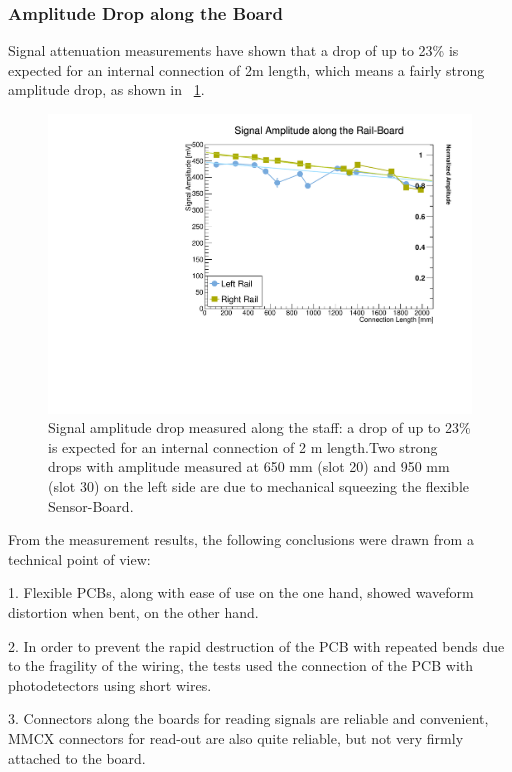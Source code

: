\documentclass[../BTOF_summary.tex]{subfiles}
\begin{document}
\subsubsection{Amplitude Drop along the Board}
Signal attenuation measurements have shown that a drop of up to 23\% is expected for an internal connection of 2m length, which means a fairly strong amplitude drop, as shown in \fig~\ref{fig:SA}.

\begin{figure}[h!]
    \centering
    \includegraphics[scale=0.5]{Pictures/SignalAmplitude.pdf}
    \caption{Signal amplitude drop measured along the staff: a drop of up to 23\% is expected for an internal connection of 2 m length.Two strong drops with amplitude measured at 650 mm (slot 20) and 950 mm (slot 30) on the left side are due to mechanical squeezing the flexible Sensor-Board.}
    \label{fig:SA}
\end{figure}



From the measurement results, the following conclusions were drawn from a technical point of view:

1. Flexible PCBs, along with ease of use on the one hand, showed waveform distortion when bent, on the other hand.

2. In order to prevent the rapid destruction of the PCB with repeated bends due to the fragility of the wiring, the tests used the connection of the PCB with photodetectors using short wires.

3. Connectors along the boards for reading signals are reliable and convenient, MMCX connectors for read-out are also quite reliable, but not very firmly attached to the board.
\end{document}
